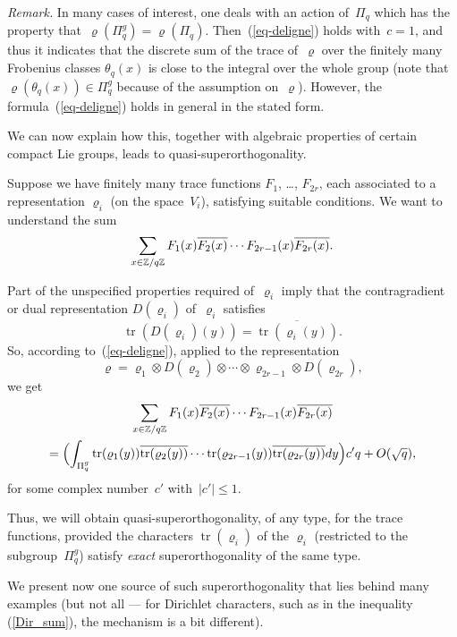 \documentclass[oneside,11pt]{amsart}
\DeclareMathOperator{\Tr}{tr}
\renewcommand{\rho}{\varrho}
\begin{document}
\emph{Remark.}
  In many cases of interest, one deals with an action of~$\Pi_q$ which
  has the property that~$\rho(\Pi_q^g)=\rho(\Pi_q)$.
  Then~(\ref{eq-deligne}) holds with~$c=1$, and thus it indicates that
  the discrete sum of the trace of~$\rho$ over the finitely many
  Frobenius classes $\theta_q(x)$ is close to the integral over the
  whole group (note that~$\rho(\theta_q(x))\in\Pi^g_q$ because of the
  assumption on~$\rho$). However, the formula~(\ref{eq-deligne}) holds
  in general in the stated form.
 

We can now explain how this, together with algebraic properties of
certain compact Lie groups, leads to quasi-superorthogonality.

Suppose we have finitely many trace functions $F_1$, \ldots, $F_{2r}$,
each associated to a representation $\rho_i$ (on the space~$V_i$),
satisfying suitable conditions.
We want to understand the sum
$$
\sum_{x\in \mathbb{Z}/q\mathbb{Z}} F_1(x)\overline{F_2(x)}\cdots
F_{2r-1}(x)\overline{F_{2r}(x)}.
$$

Part of the unspecified properties required of~$\rho_i$ imply that the
contragradient or dual representation $D(\rho_i)$ of~$\rho_i$
satisfies
$$
\Tr(D(\rho_i)(y))=\overline{\Tr(\rho_i(y))}.
$$
So, according to~(\ref{eq-deligne}), applied to the representation
$$
\rho=\rho_1\otimes D(\rho_2)\otimes \cdots\otimes \rho_{2r-1}\otimes
D(\rho_{2r}),
$$
we get
\begin{multline*}
\sum_{x\in \Z/q\Z} F_1(x)\overline{F_2(x)}\cdots
F_{2r-1}(x)\overline{F_{2r}(x)}
\\=
\Bigl(\int_{\Pi_q^g}\Tr(\rho_1(y))
\overline{\Tr(\rho_2(y))}\cdots
\Tr(\rho_{2r-1}(y))
\overline{\Tr(\rho_{2r}(y))}
dy\Bigr)c'q+O(\sqrt{q}),
\end{multline*}
for some complex number~$c'$ with~$|c'|\leq 1$.

Thus, we will obtain quasi-superorthogonality, of any type, for the
trace functions, provided the characters $\Tr(\rho_i)$ of the $\rho_i$
(restricted to the subgroup~$\Pi_q^g$) satisfy \emph{exact}
superorthogonality of the same type.

We present now one source of such superorthogonality that lies behind
many examples (but not all --- for Dirichlet characters, such as in the
inequality (\ref{Dir_sum}), the mechanism is a bit different).
\end{document}
